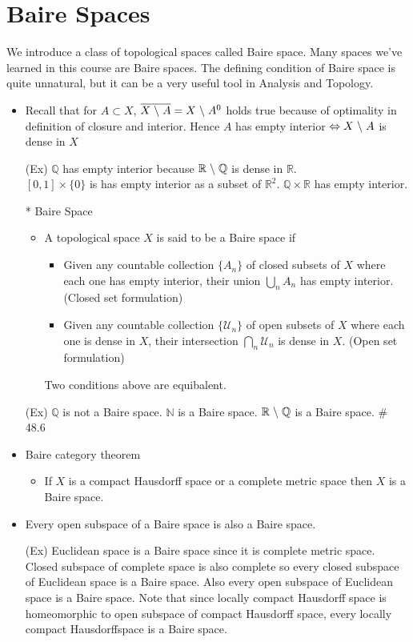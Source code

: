 \documentclass[12pt]{article}
\newcommand{\spone}{\hspace{0.1cm}}
\newcommand{\Nat}{\mathbb{N}}
\newcommand{\Real}{\mathbb{R}}
\newcommand{\U}{\mathcal{U}}
\newcommand{\cl}{\overline}
\newcommand{\diff}{\spone\backslash\spone}
\begin{document}
\section{Baire Spaces}
\bigskip
We introduce a class of topological spaces called Baire space. Many spaces we've learned in this course are Baire spaces. The defining condition of Baire space is quite unnatural, but it can be a very useful tool in Analysis and Topology.
\begin{itemize}
	\item Recall that for $A\subset X$, $\cl{X\diff A}=X\diff A^0$ holds true because of optimality in definition of closure and interior. Hence $A$ has empty interior $\Leftrightarrow X\diff A$ is dense in $X$
	\item[(Ex)] $\mathbb{Q}$ has empty interior because $\Real \diff \mathbb{Q}$ is dense in $\Real$.\\ $[0,1]\times \{0\}$ is has empty interior as a subset of $\Real^2$. \quad $\mathbb{Q}\times \Real $ has empty interior.
	\item[*] Baire Space
	\begin{itemize}
		\item A topological space $X$ is said to be a Baire space if 
		\begin{itemize}
			\item Given any countable collection $\{A_n\}$ of closed subsets of $X$ where each one has empty interior, their union $\bigcup_{n}A_n$ has empty interior. (Closed set formulation)
			\item Given any countable collection $\{\U_n\}$ of open subsets of $X$ where each one is dense in $X$, their intersection $\bigcap_{n}\U_n$ is dense in $X$. (Open set formulation)
		\end{itemize}
		Two conditions above are equibalent.
	\end{itemize} 
	\item[(Ex)] $\mathbb{Q}$ is not a Baire space. \quad $\Nat$ is a Baire space. \quad $\Real \diff \mathbb{Q}$ is a Baire space. \; \# 48.6
	\item Baire category theorem
	\begin{itemize}
		\item If $X$ is a compact Hausdorff space or a complete metric space then $X$ is a Baire space.
	\end{itemize}
	\item Every open subspace of a Baire space is also a Baire space.
	\item[(Ex)] Euclidean space is a Baire space since it is complete metric space. Closed subspace of complete space is also complete so every closed subspace of Euclidean space is a Baire space. Also every open subspace of Euclidean space is a Baire space. Note that since locally compact Hausdorff space is homeomorphic to open subspace of compact Hausdorff space, every locally compact Hausdorffspace is a Baire space.

\end{itemize}
\end{document}
